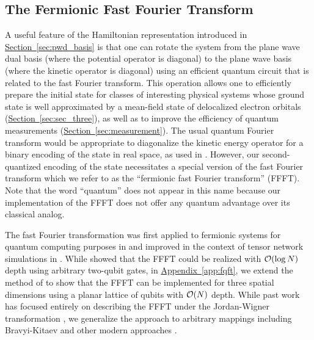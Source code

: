 \documentclass[superscriptaddress,aps,pra,nofootinbib,notitlepage,10pt,longbibliography]{revtex4-1}
\renewcommand{\sec}[1]{\hyperref[sec:#1]{Section~\ref*{sec:#1}}}
\DeclareRobustCommand{\app}[1]{\hyperref[app:#1]{Appendix~\ref*{app:#1}}}
\begin{document}
\subsection{The Fermionic Fast Fourier Transform}
\label{sec:fqft}

A useful feature of the Hamiltonian representation introduced in \sec{pwd_basis} is that one can rotate the system from the plane wave dual basis (where the potential operator is diagonal) to the plane wave basis (where the kinetic operator is diagonal) using an efficient quantum circuit that is related to the fast Fourier transform. This operation allows one to efficiently prepare the initial state for classes of interesting physical systems whose ground state is well approximated by a mean-field state of delocalized electron orbitals (\sec{sec_three}), as well as to improve the efficiency of quantum measurements (\sec{measurement}). The usual quantum Fourier transform would be appropriate to diagonalize the kinetic energy operator for a binary encoding of the state in real space, as used in \cite{Meyer1996,Meyer1997,Zalka1998,Boghosian1998,Boghosian1998b,Wiesner1996,Lloyd1996,Kassal2008,Kivlichan2016}. However, our second-quantized encoding of the state necessitates a special version of the fast Fourier transform which we refer to as the ``fermionic fast Fourier transform'' (FFFT). Note that the word ``quantum'' does not appear in this name because our implementation of the FFFT does not offer any quantum advantage over its classical analog.

The fast Fourier transformation was first applied to fermionic systems for quantum computing purposes in \cite{Verstraete2009} and improved in the context of tensor network simulations in \cite{Ferris2014}. While \cite{Ferris2014} showed that the FFFT could be realized with ${\cal O}(\log N)$ depth using arbitrary two-qubit gates, in \app{fqft}, we extend the method of \cite{Verstraete2009} to show that the FFFT can be implemented for three spatial dimensions using a planar lattice of qubits with ${\cal O}(N)$ depth. While past work has focused entirely on describing the FFFT under the Jordan-Wigner transformation \cite{Ferris2014,Verstraete2009}, we generalize the approach to arbitrary mappings including Bravyi-Kitaev \cite{Bravyi2002,Seeley2012,Tranter2015} and other modern approaches \cite{Whitfield2016,Bravyi2017,Havlicek2017}.
\end{document}
